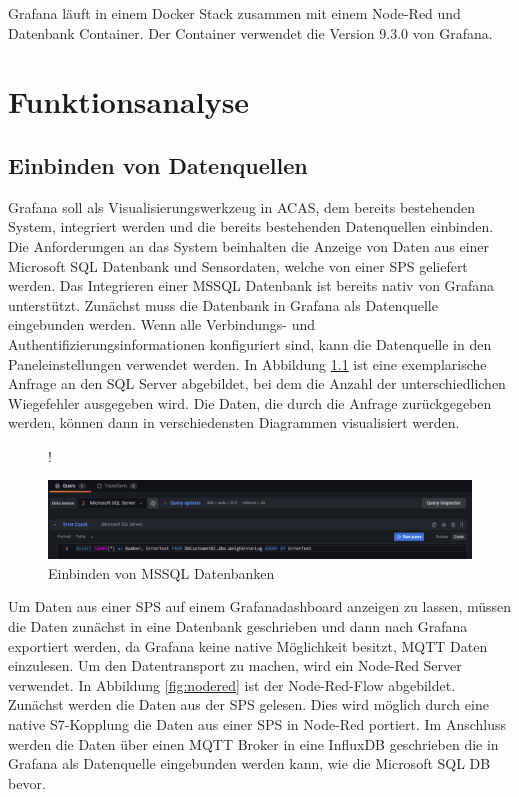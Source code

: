 \documentclass[a4paper, 12pt, oneside]{scrbook}
\begin{document}
			\noindent Grafana läuft in einem Docker Stack zusammen mit einem Node-Red und Datenbank Container. Der Container verwendet die Version 9.3.0 von Grafana.
	
	\chapter{Funktionsanalyse}
	 
		\section{Einbinden von Datenquellen} \label{Einbinden von Datenquellen}
	 
			\noindent Grafana soll als Visualisierungswerkzeug in ACAS, dem bereits bestehenden System, integriert werden und die bereits bestehenden Datenquellen einbinden. Die Anforderungen an das System beinhalten die Anzeige von Daten aus einer Microsoft SQL Datenbank und Sensordaten, welche von einer SPS geliefert werden. Das Integrieren einer MSSQL Datenbank ist bereits nativ von Grafana unterstützt. Zunächst muss die Datenbank in Grafana als Datenquelle eingebunden werden. Wenn alle Verbindungs- und Authentifizierungsinformationen konfiguriert sind, kann die Datenquelle in den Paneleinstellungen verwendet werden. In Abbildung \ref{fig:mssql_ein} ist eine exemplarische Anfrage an  den SQL Server abgebildet, bei dem die Anzahl der unterschiedlichen Wiegefehler ausgegeben wird. Die Daten, die durch die Anfrage zurückgegeben werden, können dann in verschiedensten Diagrammen visualisiert werden.
	 	
	 \begin{figure} [H]
	 	\centering
	 	\resizebox{\linewidth} {!} {
	 		\includegraphics{res/mssql_einbinden.png}
	 		
	 	}
	 	\caption{Einbinden von MSSQL Datenbanken}
	 	\label{fig:mssql_ein}
	 \end{figure}
 	
 		\noindent Um Daten aus einer SPS auf einem Grafanadashboard anzeigen zu lassen, müssen die Daten zunächst in eine Datenbank geschrieben und dann nach Grafana exportiert werden, da Grafana keine native Möglichkeit besitzt, MQTT Daten einzulesen. Um den Datentransport zu machen, wird ein Node-Red Server verwendet. In Abbildung \ref{fig:nodered} ist der Node-Red-Flow abgebildet. Zunächst werden die Daten aus der SPS gelesen. Dies wird möglich durch eine native S7-Kopplung die Daten aus einer SPS in Node-Red portiert. Im Anschluss werden die Daten über einen MQTT Broker in eine InfluxDB geschrieben die in Grafana als Datenquelle eingebunden werden kann, wie die Microsoft SQL DB bevor.
 		
\end{document}

